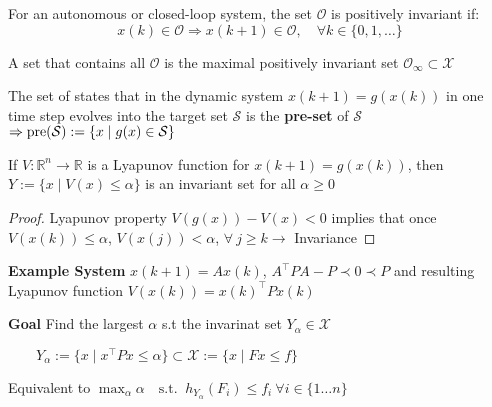 

\begin{definition}
	For an autonomous or closed-loop system,
	the set $\mathcal{O}$ is positively invariant if:
	\[
		x(k)\in\mathcal{O}\Rightarrow
		x(k+1) \in \mathcal{O},
		\quad \forall k \in \{0,1,\dots\}
	\]
\end{definition}

\begin{definition}
	A set that contains all $\mathcal{O}$
	is the maximal positively invariant set
	$\mathcal{O}_\infty \subset \mathcal{X}$
\end{definition}

\begin{definition}
	The set of states that
	in the dynamic system $x(k+1) = g(x(k))$
	in one time step evolves into the target set $\mathcal{S}$
	is the \textbf{pre-set} of $\mathcal{S}$
	$\Rightarrow \operatorname{pre}(\mathcal{S}) := \{x\mid g(x)\in \mathcal{S}\}$
\end{definition}

\begin{lemma}{}

	If $V:\mathbb{R}^n \to \mathbb{R}$ is a Lyapunov function
	for $x(k+1) = g(x(k))$, then
	$Y := \{x \mid V(x) \leq \alpha\}$
	is an invariant set for all $\alpha \geq 0$
\end{lemma}
\begin{proof}
	Lyapunov property $V(g(x)) - V(x) < 0$
	implies that once $V(x(k))\leq \alpha$,
	$V(x(j))<\alpha$,
	$\forall\ j\ge k \rightarrow$ Invariance
\end{proof}

\textbf{Example System}
$x(k+1) = Ax(k)$, $A^\top P A - P \prec 0 \prec P$
and resulting  Lyapunov function
$V(x(k)) = x(k)^\top P x(k)$

\textbf{Goal} Find the largest $\alpha$ s.t the
invarinat set $Y_\alpha \in \mathcal{X}$

$\qquad Y_\alpha := \{x \mid x^\top P x \leq \alpha\}\subset \mathcal{X} := \{x \mid Fx\leq f\}$

Equivalent to $\max_\alpha \alpha \quad \text{s.t. }\
	h_{Y_\alpha}(F_i) \leq f_i \ \forall i \in \{1\dots n\}$



